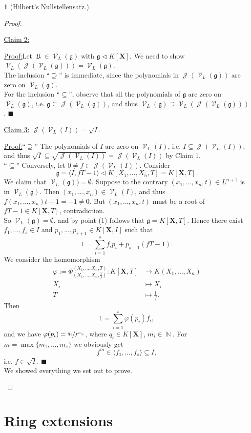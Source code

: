\documentclass[12pt,a4paper]{report}
\theoremstyle{definition}
\theoremstyle{num.custom-title}
\newtheorem{teo_custom-title}[theorem]{} %
\newenvironment{claim}[1]{\par\noindent\underline{Claim#1:}\space}{} %
\newenvironment{claimproof}[1]{\par\noindent\underline{Proof:}\space#1}{\leavevmode\unskip\penalty9999 \hbox{}\nobreak\hfill\quad\hbox{$\blacksquare$}} %
\DeclareMathOperator{\J}{\mathcal{J}}
\DeclareMathOperator{\N}{\mathbb{N}}
\DeclareMathOperator{\U}{\mathfrak{U}}
\DeclareMathOperator{\V}{\mathcal{V}}
\DeclareMathOperator{\sse}{\subseteq}
\newcommand{\g}{\mathfrak{g}}
\newcommand{\X}{\mathbf{X}}
\renewcommand{\phi}{\varphi}
\begin{document}
\begin{teo_custom-title}[Hilbert's Nullstellensatz.]
\begin{proof}
\begin{enumerate}
\begin{claim}{ 2}
\begin{claimproof}
Let $\U \in \V_L(\g)$ with $\g \lhd K[\X]$. We need to show $\V_L(\J(\V_L(\g))) = \V_L(\g)$.\\
The inclusion ``$\supseteq$'' is immediate, since the polynomials in $\J(\V_L(\g))$ are zero on $\V_L(\g)$.\\
For the inclusion ``$\sse$'', observe that all the polynomials of $\g$ are zero on $\V_L(\g)$, i.e. $\g \sse \J(\V_L(\g))$, and thus $\V_L(\g) \supseteq \V_L(\J(\V_L(\g)))$.
\end{claimproof}
\end{claim}
\begin{claim}{ 3}
$\J(\V_L(I))=\sqrt{I}$.
\begin{claimproof}
``$\supseteq$'' The polynomials of $I$ are zero on $\V_L(I)$, i.e. $I \sse \J(\V_L(I))$, and thus $\sqrt{I} \sse \sqrt{\J(\V_L(I))} = \J(\V_L(I))$ by Claim 1.\\
``$\sse$'' Conversely, let $0 \neq f \in \J(\V_L(I))$. Consider
\[
\g = \langle I, fT-1 \rangle \lhd K[X_1,\ldots,X_n,T] = K[\X,T].
\]
We claim that $\V_L(\g))=\emptyset$. Suppose to the contrary $(x_1,...,x_n,t) \in L^{n+1}$ is in $\V_L(\g)$. Then $(x_1,...,x_n) \in \V_L(I)$, and thus $f(x_1,...,x_n)t-1 = -1 \neq 0$. But $(x_1,...,x_n,t)$ must be a root of $fT-1 \in K[\X,T]$, contradiction.\\
So $\V_L(\g)=\emptyset$, and by point (1) follows that $\g=K[\X,T]$. Hence there exist $f_1,...,f_s \in I$ and $p_1,...,p_{s+1} \in K[\X,I]$ such that
\[
1 = \sum_{i=1}^s f_i p_i + p_{s+1}(fT-1).
\]
We consider the homomorphism
\begin{align*}
\phi := \Phi_{(X_1,\ldots,X_n, \frac{1}{f})}^{(X_1,\ldots,X_n,T)} : K[\X,T] & \to K(X_1,\ldots,X_n) \\
X_i & \mapsto X_i \\
T & \mapsto \frac{1}{f}.
\end{align*}
Then
\[
1 = \sum_{i=1}^s \phi(p_i)f_i,
\]
and we have $\phi(p_i) = \sfrac{q_i}{f^{m_i}}$, where $q_i \in K[\X]$, $m_i \in \N$. For $m = \max\{m_1,...,m_s\}$ we obviously get
\[
f^m \in \langle f_1, \ldots, f_s \rangle \sse I,
\]
i.e. $f \in \sqrt{I}$.
\end{claimproof}
\end{claim}\\
We showed everything we set out to prove.
\end{enumerate}
\end{proof}
\end{teo_custom-title}

\chapter{Ring extensions}
\end{document}
